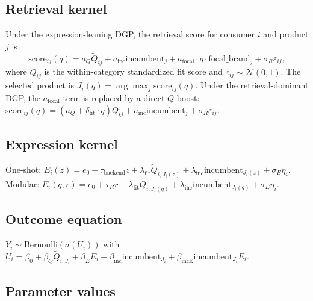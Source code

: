 \documentclass[11pt]{article}
\newcommand{\E}{E}
\newcommand{\J}{J}
\newcommand{\Y}{Y}
\newcommand{\Q}{Q}
\begin{document}
\subsection{Retrieval kernel}

Under the expression-leaning DGP, the retrieval score for consumer $i$ and product $j$ is
\[
\mathrm{score}_{ij}(q) = a_Q \tilde{\Q}_{ij} + a_{\mathrm{inc}} \mathrm{incumbent}_j + a_{\mathrm{focal}} \cdot q \cdot \mathrm{focal\_brand}_j + \sigma_R \varepsilon_{ij},
\]
where $\tilde{\Q}_{ij}$ is the within-category standardized fit score and $\varepsilon_{ij} \sim \mathcal{N}(0, 1)$. The selected product is $\J_i(q) = \arg\max_{j} \mathrm{score}_{ij}(q)$. Under the retrieval-dominant DGP, the $a_{\mathrm{focal}}$ term is replaced by a direct $Q$-boost: $\mathrm{score}_{ij}(q) = (a_Q + \delta_{\mathrm{fit}} \cdot q) \tilde{\Q}_{ij} + a_{\mathrm{inc}} \mathrm{incumbent}_j + \sigma_R \varepsilon_{ij}$.

\subsection{Expression kernel}

One-shot: $\E_i(z) = e_0 + \tau_{\mathrm{backend}} z + \lambda_{\mathrm{fit}} \tilde{\Q}_{i, \J_i(z)} + \lambda_{\mathrm{inc}} \mathrm{incumbent}_{\J_i(z)} + \sigma_E \eta_i$.
Modular: $\E_i(q, r) = e_0 + \tau_R r + \lambda_{\mathrm{fit}} \tilde{\Q}_{i, \J_i(q)} + \lambda_{\mathrm{inc}} \mathrm{incumbent}_{\J_i(q)} + \sigma_E \eta_i$.

\subsection{Outcome equation}

$\Y_i \sim \mathrm{Bernoulli}(\sigma(U_i))$ with $U_i = \beta_0 + \beta_Q \tilde{\Q}_{i,\J_i} + \beta_E \E_i + \beta_{\mathrm{inc}} \mathrm{incumbent}_{\J_i} + \beta_{\mathrm{incE}} \mathrm{incumbent}_{\J_i} \E_i$.

\subsection{Parameter values}
\end{document}
